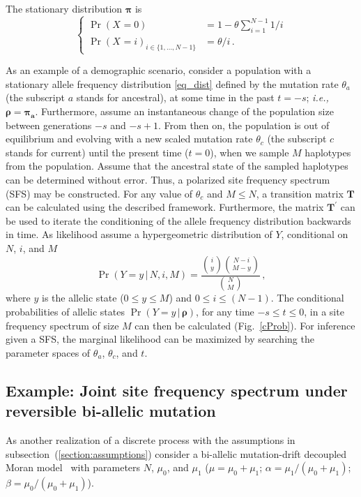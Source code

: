 \documentclass[preprint]{elsarticle}
\newcommand{\bs}[1]{\ensuremath{\boldsymbol{#1}}}
\newcommand\given{{\,|\,}}
\newcommand\ie{{\it i.e.,}}
\newcommand\x[1]{\ensuremath{X_{#1}}}
\newcommand\y{\ensuremath{Y}}
\begin{document}
The stationary distribution $\bs{\pi}$ is 
\begin{equation}\label{eq_dist}
\begin{cases}
\Pr(\x{}=0)&=1-\theta\sum_{i=1}^{N-1}1/i\\
\Pr(\x{}=i)_{i \in \{1, \ldots, N-1\}} &=\theta/i\,.
\end{cases}
\end{equation}

As an example of a demographic scenario, consider a population with a stationary allele frequency distribution \eqref{eq_dist} defined by the mutation rate $\theta_a$ (the subscript $a$ stands for ancestral), at some time in the past $t=-s$; \ie\ $\bs{\rho} = \bs{\pi_a}$. Furthermore, assume an instantaneous change of the population size between generations $-s$ and $-s+1$. From then on, the population is out of equilibrium and evolving with a new scaled mutation rate $\theta_c$ (the subscript $c$ stands for current) until the present time ($t=0$), when we sample $M$ haplotypes from the population. Assume that the ancestral state of the sampled haplotypes can be determined without error. Thus, a polarized site frequency spectrum (SFS) may be constructed. For any value of $\theta_c$ and $M \leq N$, a transition matrix $\mathbf{T}$ can be calculated using the described framework. Furthermore, the matrix $\mathbf{T}^{'}$ can be used to iterate the conditioning of the allele frequency distribution backwards in time. As likelihood assume a hypergeometric distribution of $Y$, conditional on $N$, $i$, and $M$
\begin{equation}\label{X0}
\Pr(\y=y\given N,i,M)=\frac{\binom{i}{y}\binom{N-i}{M-y}}{\binom{N}{M}}\,,
\end{equation}
where $y$ is the allelic state ($0\leq y\leq M$) and $0\leq i\leq (N-1)$. The conditional probabilities of allelic states $\Pr(Y = y \given \bs{\rho})$, for any time $-s\leq t\leq 0$, in a site frequency spectrum of size $M$ can then be calculated (Fig.~\ref{cProb}). For inference given a SFS, the marginal likelihood can be maximized by searching the parameter spaces of $\theta_a$, $\theta_c$, and $t$.

\subsection{Example: Joint site frequency spectrum under reversible bi-allelic mutation}\label{section:discr_rev_general}
As another realization of a discrete process with the assumptions in subsection~(\ref{section:assumptions}) consider a bi-allelic mutation-drift decoupled Moran model~\citep{Baak08,Ethe09} with parameters $N$, $\mu_0$, and $\mu_1$ ($\mu=\mu_0+\mu_1$; $\alpha=\mu_1/(\mu_0+\mu_1)$; $\beta=\mu_0/(\mu_0+\mu_1)$).
\end{document}
